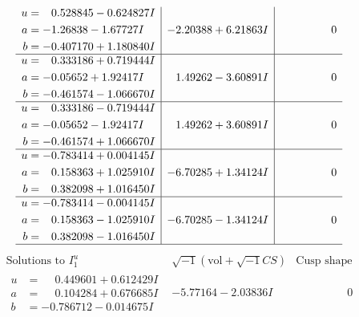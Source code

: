 \documentclass[1p]{elsarticle_modified}
\theoremstyle{definition}
\newcommand{\I}{\sqrt{-1}}
\begin{document}
$$\begin{array}{c|c|c}
\begin{aligned}
u &= \phantom{-}0.528845 - 0.624827 I \\
a &= -1.26838 - 1.67727 I \\
b &= -0.407170 + 1.180840 I\end{aligned}
 & -2.20388 + 6.21863 I & \phantom{-0.000000 } 0 \\ \hline\begin{aligned}
u &= \phantom{-}0.333186 + 0.719444 I \\
a &= -0.05652 + 1.92417 I \\
b &= -0.461574 - 1.066670 I\end{aligned}
 & \phantom{-}1.49262 - 3.60891 I & \phantom{-0.000000 } 0 \\ \hline\begin{aligned}
u &= \phantom{-}0.333186 - 0.719444 I \\
a &= -0.05652 - 1.92417 I \\
b &= -0.461574 + 1.066670 I\end{aligned}
 & \phantom{-}1.49262 + 3.60891 I & \phantom{-0.000000 } 0 \\ \hline\begin{aligned}
u &= -0.783414 + 0.004145 I \\
a &= \phantom{-}0.158363 + 1.025910 I \\
b &= \phantom{-}0.382098 + 1.016450 I\end{aligned}
 & -6.70285 + 1.34124 I & \phantom{-0.000000 } 0 \\ \hline\begin{aligned}
u &= -0.783414 - 0.004145 I \\
a &= \phantom{-}0.158363 - 1.025910 I \\
b &= \phantom{-}0.382098 - 1.016450 I\end{aligned}
 & -6.70285 - 1.34124 I & \phantom{-0.000000 } 0\\
 \hline 
 \end{array}$$\newpage$$\begin{array}{c|c|c}  
\text{Solutions to }I^u_{1}& \I (\text{vol} + \sqrt{-1}CS) & \text{Cusp shape}\\
 \hline 
\begin{aligned}
u &= \phantom{-}0.449601 + 0.612429 I \\
a &= \phantom{-}0.104284 + 0.676685 I \\
b &= -0.786712 - 0.014675 I\end{aligned}
 & -5.77164 - 2.03836 I & \phantom{-0.000000 } 0 \\ \hline\begin{aligned}

\end{aligned}
\end{array}$$
\end{document}
